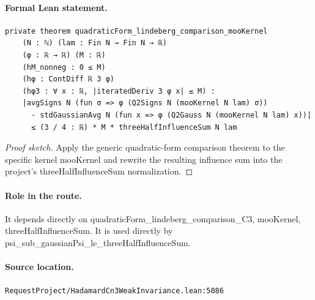 \medskip
\paragraph{Formal Lean statement.}
\begin{verbatim}
private theorem quadraticForm_lindeberg_comparison_mooKernel
    (N : ℕ) (lam : Fin N → Fin N → ℝ)
    (φ : ℝ → ℝ) (M : ℝ)
    (hM_nonneg : 0 ≤ M)
    (hφ : ContDiff ℝ 3 φ)
    (hφ3 : ∀ x : ℝ, |iteratedDeriv 3 φ x| ≤ M) :
    |avgSigns N (fun σ => φ (Q2Signs N (mooKernel N lam) σ))
      - stdGaussianAvg N (fun x => φ (Q2Gauss N (mooKernel N lam) x))|
      ≤ (3 / 4 : ℝ) * M * threeHalfInfluenceSum N lam
\end{verbatim}
\begin{proof}[Proof sketch]
Apply the generic quadratic-form comparison theorem to the specific kernel mooKernel and rewrite the resulting influence sum into the project's threeHalfInfluenceSum normalization.
\end{proof}
\paragraph{Role in the route.}
It depends directly on quadraticForm\_lindeberg\_comparison\_C3, mooKernel, threeHalfInfluenceSum. It is used directly by psi\_sub\_gaussianPsi\_le\_threeHalfInfluenceSum.
\paragraph{Source location.}
\texttt{RequestProject/HadamardCn3WeakInvariance.lean:5086}
\medskip
